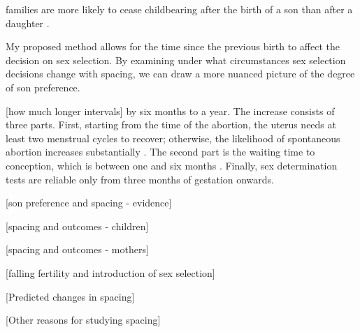  
 
 
 
 
 
 families are more likely to cease childbearing after the birth of 
a son than after a daughter \citep{Das1987,Arnold1997,arnold98,clark00,dreze01,Basu2010}.







My proposed method allows for the time since the previous 
birth to affect the decision on sex selection.
By examining under what circumstances sex selection decisions change with 
spacing, we can draw a more nuanced picture of the degree of son preference.





[how much longer intervals]
 by six months to a year.
The increase consists of three parts.
First, starting from the time of the abortion, the uterus needs at 
least two menstrual cycles to recover;  otherwise, the likelihood 
of spontaneous abortion increases substantially \citep{zhou00b}.
The second part is the waiting time to conception, which is between 
one and six months \citep{Wang2003}.
Finally, sex determination tests are reliable only from three months 
of gestation onwards.











[son preference and spacing - evidence]

[spacing and outcomes - children]

[spacing and outcomes - mothers]

[falling fertility and introduction of sex selection]

[Predicted changes in spacing]

[Other reasons for studying spacing]





 
